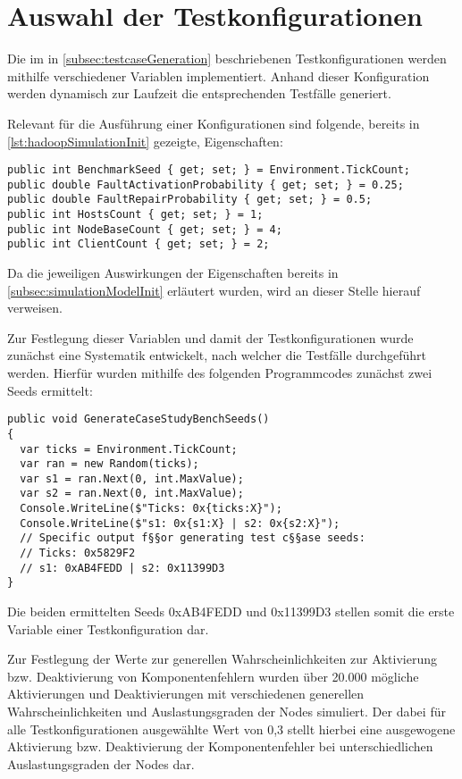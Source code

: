 \section{Auswahl der Testkonfigurationen}
\label{sec:selectTestcases}

Die im in \cref{subsec:testcaseGeneration} beschriebenen Testkonfigurationen werden mithilfe verschiedener Variablen implementiert.
Anhand dieser Konfiguration werden dynamisch zur Laufzeit die entsprechenden Testfälle generiert.

Relevant für die Ausführung einer Konfigurationen sind folgende, bereits in \cref{lst:hadoopSimulationInit} gezeigte, Eigenschaften:

\begin{lstlisting}[label=lst:hadoopTest,style=cs,
caption={Zur Definition einer Testkonfiguration relevante Felder}]
public int BenchmarkSeed { get; set; } = Environment.TickCount;
public double FaultActivationProbability { get; set; } = 0.25;
public double FaultRepairProbability { get; set; } = 0.5;
public int HostsCount { get; set; } = 1;
public int NodeBaseCount { get; set; } = 4;
public int ClientCount { get; set; } = 2;
\end{lstlisting}

Da die jeweiligen Auswirkungen der Eigenschaften bereits in \cref{subsec:simulationModelInit} erläutert wurden, wird an dieser Stelle hierauf verweisen.

Zur Festlegung dieser Variablen und damit der Testkonfigurationen wurde zunächst eine Systematik entwickelt, nach welcher die Testfälle durchgeführt werden.
Hierfür wurden mithilfe des folgenden Programmcodes zunächst zwei Seeds ermittelt:

\begin{lstlisting}[label=lst:generateTestCaseSeeds,style=cs,
caption={Ermittlung der für die Testkonfigurationen genutzten Basisseeds}]
public void GenerateCaseStudyBenchSeeds()
{
  var ticks = Environment.TickCount;
  var ran = new Random(ticks);
  var s1 = ran.Next(0, int.MaxValue);
  var s2 = ran.Next(0, int.MaxValue);
  Console.WriteLine($"Ticks: 0x{ticks:X}");
  Console.WriteLine($"s1: 0x{s1:X} | s2: 0x{s2:X}");
  // Specific output f§§or generating test c§§ase seeds:
  // Ticks: 0x5829F2
  // s1: 0xAB4FEDD | s2: 0x11399D3
}
\end{lstlisting}

Die beiden ermittelten Seeds 0xAB4FEDD und 0x11399D3 stellen somit die erste Variable einer Testkonfiguration dar.

Zur Festlegung der Werte zur generellen Wahrscheinlichkeiten zur Aktivierung bzw. Deaktivierung von Komponentenfehlern wurden über 20.000 mögliche Aktivierungen und Deaktivierungen mit verschiedenen generellen Wahrscheinlichkeiten und Auslastungsgraden der Nodes simuliert.
Der dabei für alle Testkonfigurationen ausgewählte Wert von 0,3 stellt hierbei eine ausgewogene Aktivierung bzw. Deaktivierung der Komponentenfehler bei unterschiedlichen Auslastungsgraden der Nodes dar.

